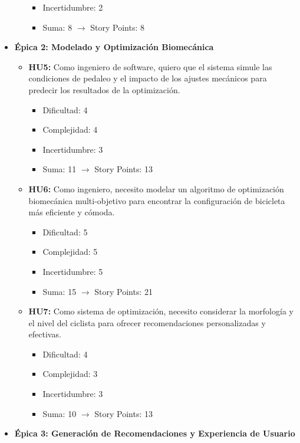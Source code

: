 \documentclass[
11pt, %
]{charter}
\begin{document}
\begin{itemize}
\begin{itemize}
\begin{itemize}
          \item Incertidumbre: 2
          \item Suma: 8 $\rightarrow$ Story Points: 8
        \end{itemize}
    \end{itemize}
  \item \textbf{Épica 2: Modelado y Optimización Biomecánica}
    \begin{itemize}
      \item \textbf{HU5:} Como ingeniero de software, quiero que el sistema simule las condiciones de pedaleo y el impacto de los ajustes mecánicos para predecir los resultados de la optimización.
        \begin{itemize}
          \item Dificultad: 4
          \item Complejidad: 4
          \item Incertidumbre: 3
          \item Suma: 11 $\rightarrow$ Story Points: 13
        \end{itemize}
      \item \textbf{HU6:} Como ingeniero, necesito modelar un algoritmo de optimización biomecánica multi-objetivo para encontrar la configuración de bicicleta más eficiente y cómoda.
        \begin{itemize}
          \item Dificultad: 5
          \item Complejidad: 5
          \item Incertidumbre: 5
          \item Suma: 15 $\rightarrow$ Story Points: 21
        \end{itemize}
      \item \textbf{HU7:} Como sistema de optimización, necesito considerar la morfología y el nivel del ciclista para ofrecer recomendaciones personalizadas y efectivas.
        \begin{itemize}
          \item Dificultad: 4
          \item Complejidad: 3
          \item Incertidumbre: 3
          \item Suma: 10 $\rightarrow$ Story Points: 13
        \end{itemize}
    \end{itemize}
  \item \textbf{Épica 3: Generación de Recomendaciones y Experiencia de Usuario}

\end{itemize}
\end{document}
